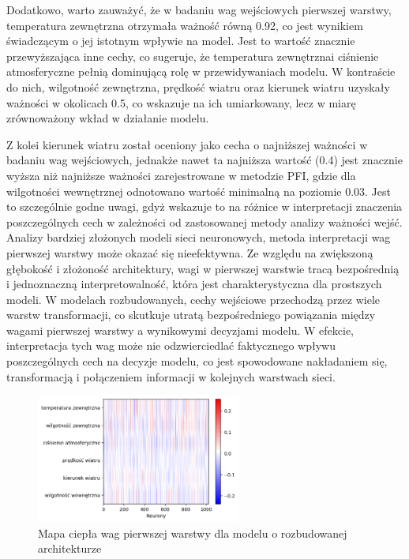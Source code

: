 \documentclass[a4paper,twoside,12pt]{book}
\begin{document}
Dodatkowo, warto zauważyć, że w badaniu wag wejściowych pierwszej warstwy, temperatura zewnętrzna otrzymała ważność równą 0.92, co jest wynikiem świadczącym o jej istotnym wpływie na model. Jest to wartość znacznie przewyższająca inne cechy, co sugeruje, że temperatura zewnętrznai ciśnienie atmosferyczne pełnią dominującą rolę w przewidywaniach modelu. W kontraście do nich, wilgotność zewnętrzna, prędkość wiatru oraz kierunek wiatru uzyskały ważności w okolicach 0.5, co wskazuje na ich umiarkowany, lecz w miarę zrównoważony wkład w działanie modelu.

Z kolei kierunek wiatru został oceniony jako cecha o najniższej ważności w badaniu wag wejściowych, jednakże nawet ta najniższa wartość (0.4) jest znacznie wyższa niż najniższe ważności zarejestrowane w metodzie PFI, gdzie dla wilgotności wewnętrznej odnotowano wartość minimalną na poziomie 0.03. Jest to szczególnie godne uwagi, gdyż wskazuje to na różnice w interpretacji znaczenia poszczególnych cech w zależności od zastosowanej metody analizy ważności wejść.\\

Analizy bardziej złożonych modeli sieci neuronowych, metoda interpretacji wag pierwszej warstwy może okazać się nieefektywna. Ze względu na zwiększoną głębokość i złożoność architektury, wagi w pierwszej warstwie tracą bezpośrednią i jednoznaczną interpretowalność, która jest charakterystyczna dla prostszych modeli. W modelach rozbudowanych, cechy wejściowe przechodzą przez wiele warstw transformacji, co skutkuje utratą bezpośredniego powiązania między wagami pierwszej warstwy a wynikowymi decyzjami modelu. W efekcie, interpretacja tych wag może nie odzwierciedlać faktycznego wpływu poszczególnych cech na decyzje modelu, co jest spowodowane nakładaniem się, transformacją i połączeniem informacji w kolejnych warstwach sieci.
\newpage
\begin{figure}[!h]
  \centering
  \includegraphics[width=0.6\textwidth]{img/heatmap2.png}
  \caption{Mapa ciepła wag pierwszej warstwy dla modelu o rozbudowanej architekturze}
  \label{fig:etykieta-rysunku}
\end{figure}
\end{document}
